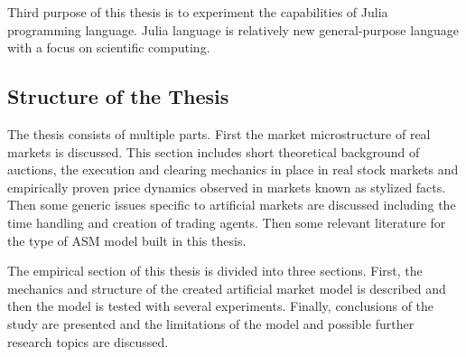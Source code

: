 Third purpose of this thesis is to experiment the capabilities of Julia programming language.
Julia language is relatively new general-purpose language with a focus on scientific computing.


\subsection{Structure of the Thesis}
The thesis consists of multiple parts. First the market microstructure of real markets is discussed. 
This section includes short theoretical background of auctions, the execution and clearing mechanics in place in real
stock markets and empirically proven price dynamics observed in markets known as stylized
facts. Then some generic issues specific to artificial markets are discussed including the time handling and creation
of trading agents. Then some relevant literature for the type of ASM model built in this thesis.

The empirical section of this thesis is divided into three sections. First, the mechanics and
structure of the created artificial market model is described and then the model is tested
with several experiments. Finally, conclusions of the study are presented and the limitations of the model and
possible further research topics are discussed.